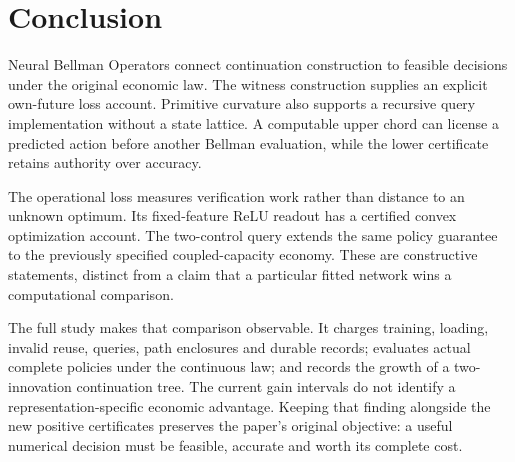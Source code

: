 \documentclass[ecta,nameyear,draft]{econsocart}
\begin{document}













\section{Conclusion}\label{sec:conclusion65}
Neural Bellman Operators connect continuation construction to feasible decisions under the original economic law. The witness construction supplies an explicit own-future loss account. Primitive curvature also supports a recursive query implementation without a state lattice. A computable upper chord can license a predicted action before another Bellman evaluation, while the lower certificate retains authority over accuracy.

The operational loss measures verification work rather than distance to an unknown optimum. Its fixed-feature ReLU readout has a certified convex optimization account. The two-control query extends the same policy guarantee to the previously specified coupled-capacity economy. These are constructive statements, distinct from a claim that a particular fitted network wins a computational comparison.

The full study makes that comparison observable. It charges training, loading, invalid reuse, queries, path enclosures and durable records; evaluates actual complete policies under the continuous law; and records the growth of a two-innovation continuation tree. The current gain intervals do not identify a representation-specific economic advantage. Keeping that finding alongside the new positive certificates preserves the paper's original objective: a useful numerical decision must be feasible, accurate and worth its complete cost.


\end{document}
